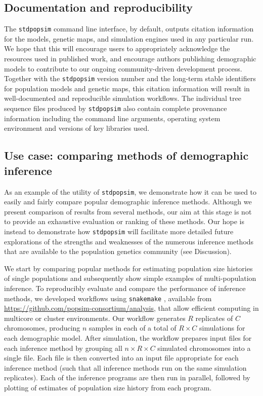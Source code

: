 \documentclass[12pt,halfline,a4paper]{ouparticle}
\newcommand{\stdpopsim}{\texttt{stdpopsim}\xspace}
\begin{document}
\subsection*{Documentation and reproducibility}

The \stdpopsim command line interface, by default, outputs citation information
for the models, genetic maps, and simulation engines used in any particular run.
We hope that this will encourage users to appropriately acknowledge the
resources used in published work, and encourage authors
publishing demographic models to contribute to our ongoing community-driven development process.
Together with the \stdpopsim version number and the long-term stable identifiers
for population models and genetic maps,
this citation information will result in well-documented and reproducible
simulation workflows. The individual tree sequence files produced by
\stdpopsim also contain complete provenance information including the command
line arguments, operating system environment and versions of key libraries
used.

\subsection*{Use case: comparing methods of demographic inference}

As an example of the utility of \stdpopsim, we demonstrate how it can be used
to easily and fairly compare popular demographic inference methods.
Although we present comparison of results from several
methods, our aim at this stage is not to provide an exhaustive
evaluation or ranking of these methods. Our hope is instead to demonstrate how \stdpopsim
will facilitate more detailed future explorations of the strengths and weaknesses of the numerous
inference methods that are available to the population genetics community
(see Discussion).

We start by comparing popular methods for estimating
population size histories of single populations and subsequently
show simple examples of multi-population inference.
To reproducibly evaluate and compare the performance of inference methods, we developed
workflows using \texttt{snakemake} \citep{koster2012snakemake},
available from \url{https://github.com/popsim-consortium/analysis},
that allow efficient computing in multicore or cluster environments.
Our workflow generates $R$ replicates of $C$ chromosomes,
producing $n$ samples in each of a total of $R \times C$ simulations for each demographic model.
After simulation,
the workflow prepares input files for each inference method
by grouping all $n \times R \times C$ simulated chromosomes
into a single file.
Each file is then converted into an input file appropriate for each inference method
(such that all inference methods run on the same simulation replicates).
Each of the inference programs are then run in parallel, followed by plotting of
estimates of population size history from each program.
\end{document}
